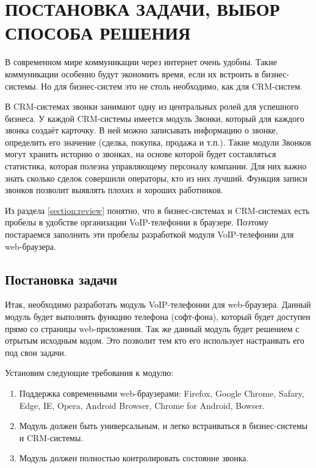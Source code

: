 \chapter{ПОСТАНОВКА ЗАДАЧИ, ВЫБОР СПОСОБА РЕШЕНИЯ}

В современном мире коммуникации через интернет очень удобны. Такие коммуникации особенно будут экономить время, если их встроить в бизнес-системы. Но для бизнес-систем это не столь необходимо, как для CRM-систем.

В CRM-системах звонки занимают одну из центральных ролей для успешного бизнеса. У каждой CRM-системы имеется модуль Звонки, который для каждого звонка создаёт карточку. В ней можно записывать информацию о звонке, определить его значение (сделка, покупка, продажа и т.п.). Такие модули Звонков могут хранить историю о звонках, на основе которой будет составляться статистика, которая полезна управляющему персоналу компании. Для них важно знать сколько сделок совершили операторы, кто из них лучший. Функция записи звонков позволит выявлять плохих и хороших работников.

Из раздела \ref{section:review} понятно, что в бизнес-системах и CRM-системах есть пробелы в удобстве организации VoIP-телефонии в браузере. Поэтому постараемся заполнить эти пробелы разработкой модуля VoIP-телефонии для web-браузера.

\section{Постановка задачи}

Итак, необходимо разработать модуль VoIP-телефонии для web-браузера. Данный модуль будет выполнять функцию телефона (софт-фона), который будет доступен прямо со страницы web-приложения. Так же данный модуль будет решением с отрытым исходным кодом. Это позволит тем кто его использует настраивать его под свои задачи.

Установим следующие требования к модулю:
\begin{enumerate}
\item Поддержка современными web-браузерами: Firefox, Google Chrome, Safary, Edge, IE, Opera, Android Browser, Chrome for Android, Bowser.
\item Модуль должен быть универсальным, и легко встраиваться в бизнес-системы и CRM-системы.
\item Модуль должен полностью контролировать состояние звонка.
\end{enumerate}

